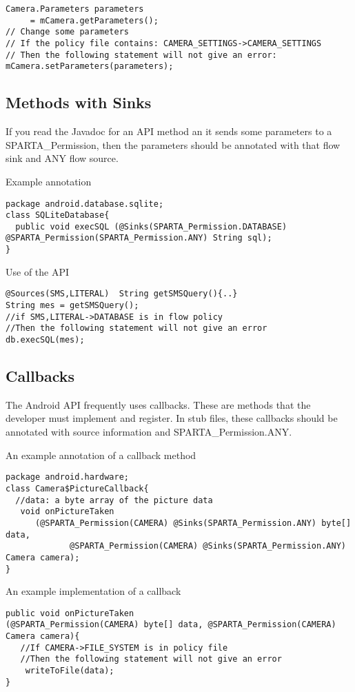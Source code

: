 \begin{Verbatim}
Camera.Parameters parameters
     = mCamera.getParameters();
// Change some parameters
// If the policy file contains: CAMERA_SETTINGS->CAMERA_SETTINGS
// Then the following statement will not give an error:
mCamera.setParameters(parameters);
\end{Verbatim}



\subsection{Methods with Sinks}
If you read the Javadoc for an API method an it sends some parameters to a SPARTA_Permission, then the parameters
should be annotated with that flow sink and ANY flow source.  

Example annotation
\begin{Verbatim}
package android.database.sqlite;
class SQLiteDatabase{
  public void execSQL (@Sinks(SPARTA_Permission.DATABASE) @SPARTA_Permission(SPARTA_Permission.ANY) String sql);
}
\end{Verbatim}
Use of the API
\begin{Verbatim}
@Sources(SMS,LITERAL)  String getSMSQuery(){..}
String mes = getSMSQuery();
//if SMS,LITERAL->DATABASE is in flow policy
//Then the following statement will not give an error
db.execSQL(mes);
\end{Verbatim}

\subsection{Callbacks}
The Android API frequently uses callbacks.  These are methods that the developer must 
implement and register.  In stub files, these callbacks should be annotated
with source information and SPARTA_Permission.ANY.  

An example annotation of a callback method
\begin{Verbatim}
package android.hardware;
class Camera$PictureCallback{
  //data: a byte array of the picture data
   void onPictureTaken 
      (@SPARTA_Permission(CAMERA) @Sinks(SPARTA_Permission.ANY) byte[] data, 
             @SPARTA_Permission(CAMERA) @Sinks(SPARTA_Permission.ANY)  Camera camera);
}
\end{Verbatim}

An example implementation of a callback
\begin{Verbatim}
public void onPictureTaken
(@SPARTA_Permission(CAMERA) byte[] data, @SPARTA_Permission(CAMERA) Camera camera){
   //If CAMERA->FILE_SYSTEM is in policy file
   //Then the following statement will not give an error
    writeToFile(data);
}
\end{Verbatim}


